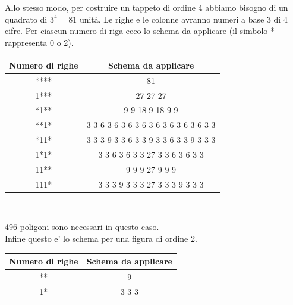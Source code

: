 Allo stesso modo, per costruire un tappeto di ordine 4 abbiamo bisogno di un quadrato di $3^4=81$ unità. Le righe e le colonne avranno numeri a base 3 di 4 cifre. Per ciascun numero di riga ecco lo schema da applicare (il simbolo * rappresenta 0 o 2).
\begin{center}
	\begin{tabular}{|c|c|}
		\hline
		Numero di righe & Schema da applicare\\
		\hline
		**** & 81 \\ 
		\hline
		1*** &  27 27 27 \\
		\hline
		*1** & 9 9 18 9 18 9 9 \\
		\hline
		**1* & 3 3 6 3 6 3 6 3 6 3 6 3 6 3 6 3 6 3 3 \\
		\hline
		*11* &  3 3 3 9 3 3 6 3 3 9 3 3 6 3 3 9 3 3 3 \\
		\hline
		1*1* & 3 3 6 3 6 3 3 27 3 3 6 3 6 3 3 \\
		\hline
		11** & 9 9 9 27 9 9 9 \\
		\hline
		111*& 3 3 3 9 3 3 3 27 3 3 3 9 3 3 3 \\
		\hline
	\end{tabular}\\
\end{center}
496 poligoni sono necessari in questo caso.\\
Infine questo e' lo schema per una figura di ordine 2.
\begin{center}
	\begin{tabular}{|c|c|}
		\hline
		Numero di righe & Schema da applicare\\
		\hline
		** &  9 \\
		\hline
		1* & 3 3 3 \\ 
		\hline
	\end{tabular}
\end{center}



